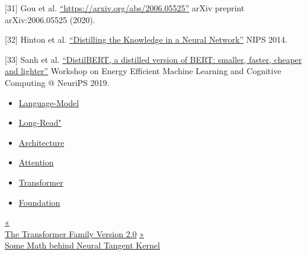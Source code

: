 {[}31{]} Gou et al. \href{https://arxiv.org/abs/2006.05525}{``https://arxiv.org/abs/2006.05525''} arXiv preprint arXiv:2006.05525 (2020).

{[}32{]} Hinton et al. \href{https://arxiv.org/abs/1503.02531}{``Distilling the Knowledge in a Neural Network''} NIPS 2014.

{[}33{]} Sanh et al. \href{https://arxiv.org/abs/1910.01108}{``DistilBERT, a distilled version of BERT: smaller, faster, cheaper and lighter''} Workshop on Energy Efficient Machine Learning and Cognitive Computing @ NeuriPS 2019.

\begin{itemize}
\tightlist
\item
  \href{https://lilianweng.github.io/tags/language-model/}{Language-Model}
\item
  \href{https://lilianweng.github.io/tags/long-read/}{Long-Read"}
\item
  \href{https://lilianweng.github.io/tags/architecture/}{Architecture}
\item
  \href{https://lilianweng.github.io/tags/attention/}{Attention}
\item
  \href{https://lilianweng.github.io/tags/transformer/}{Transformer}
\item
  \href{https://lilianweng.github.io/tags/foundation/}{Foundation}
\end{itemize}

\href{https://lilianweng.github.io/posts/2023-01-27-the-transformer-family-v2/}{{« }\\
{The Transformer Family Version 2.0}} \href{https://lilianweng.github.io/posts/2022-09-08-ntk/}{{ »}\\
{Some Math behind Neural Tangent Kernel}}

